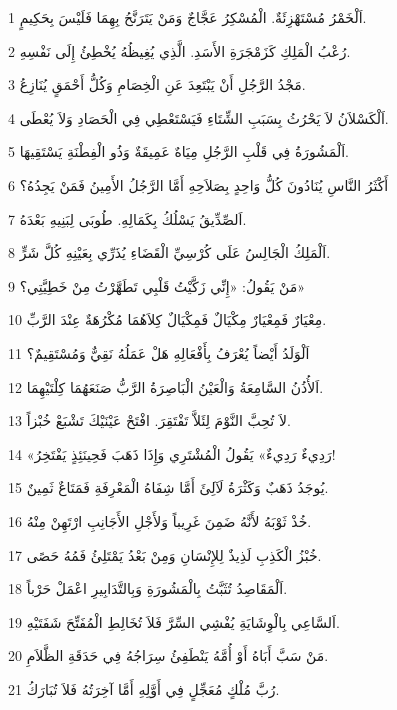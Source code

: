 \par 1 اَلْخَمْرُ مُسْتَهْزِئَةٌ. الْمُسْكِرُ عَجَّاجٌ وَمَنْ يَتَرَنَّحُ بِهِمَا فَلَيْسَ بِحَكِيمٍ.
\par 2 رُعْبُ الْمَلِكِ كَزَمْجَرَةِ الأَسَدِ. الَّذِي يُغِيظُهُ يُخْطِئُ إِلَى نَفْسِهِ.
\par 3 مَجْدُ الرَّجُلِ أَنْ يَبْتَعِدَ عَنِ الْخِصَامِ وَكُلُّ أَحْمَقٍ يُنَازِعُ.
\par 4 اَلْكَسْلاَنُ لاَ يَحْرُثُ بِسَبَبِ الشِّتَاءِ فَيَسْتَعْطِي فِي الْحَصَادِ وَلاَ يُعْطَى.
\par 5 اَلْمَشُورَةُ فِي قَلْبِ الرَّجُلِ مِيَاهٌ عَمِيقَةٌ وَذُو الْفِطْنَةِ يَسْتَقِيهَا.
\par 6 أَكْثَرُ النَّاسِ يُنَادُونَ كُلُّ وَاحِدٍ بِصَلاَحِهِ أَمَّا الرَّجُلُ الأَمِينُ فَمَنْ يَجِدُهُ؟
\par 7 اَلصِّدِّيقُ يَسْلُكُ بِكَمَالِهِ. طُوبَى لِبَنِيهِ بَعْدَهُ.
\par 8 اَلْمَلِكُ الْجَالِسُ عَلَى كُرْسِيِّ الْقَضَاءِ يُذَرِّي بِعَيْنِهِ كُلَّ شَرٍّ.
\par 9 مَنْ يَقُولُ: «إِنِّي زَكَّيْتُ قَلْبِي تَطَهَّرْتُ مِنْ خَطِيَّتِي؟»
\par 10 مِعْيَارٌ فَمِعْيَارٌ مِكْيَالٌ فَمِكْيَالٌ كِلاَهُمَا مُكْرُهَةٌ عِنْدَ الرَّبِّ.
\par 11 اَلْوَلَدُ أَيْضاً يُعْرَفُ بِأَفْعَالِهِ هَلْ عَمَلُهُ نَقِيٌّ وَمُسْتَقِيمٌ؟
\par 12 اَلأُذُنُ السَّامِعَةُ وَالْعَيْنُ الْبَاصِرَةُ الرَّبُّ صَنَعَهُمَا كِلْتَيْهِمَا.
\par 13 لاَ تُحِبَّ النَّوْمَ لِئَلاَّ تَفْتَقِرَ. افْتَحْ عَيْنَيْكَ تَشْبَعْ خُبْزاً.
\par 14 «رَدِيءٌ رَدِيءٌ» يَقُولُ الْمُشْتَرِي وَإِذَا ذَهَبَ فَحِينَئِذٍ يَفْتَخِرُ!
\par 15 يُوجَدُ ذَهَبٌ وَكَثْرَةُ لَآلِئَ أَمَّا شِفَاهُ الْمَعْرِفَةِ فَمَتَاعٌ ثَمِينٌ.
\par 16 خُذْ ثَوْبَهُ لأَنَّهُ ضَمِنَ غَرِيباً وَلأَجْلِ الأَجَانِبِ ارْتَهِنْ مِنْهُ.
\par 17 خُبْزُ الْكَذِبِ لَذِيذٌ لِلإِنْسَانِ وَمِنْ بَعْدُ يَمْتَلِئُ فَمُهُ حَصًى.
\par 18 اَلْمَقَاصِدُ تُثَبَّتُ بِالْمَشُورَةِ وَبِالتَّدَابِيرِ اعْمَلْ حَرْباً.
\par 19 اَلسَّاعِي بِالْوِشَايَةِ يُفْشِي السِّرَّ فَلاَ تُخَالِطِ الْمُفَتِّحَ شَفَتَيْهِ.
\par 20 مَنْ سَبَّ أَبَاهُ أَوْ أُمَّهُ يَنْطَفِئُ سِرَاجُهُ فِي حَدَقَةِ الظَّلاَمِ.
\par 21 رُبَّ مُلْكٍ مُعَجِّلٍ فِي أَوَّلِهِ أَمَّا آخِرَتُهُ فَلاَ تُبَارَكُ.
